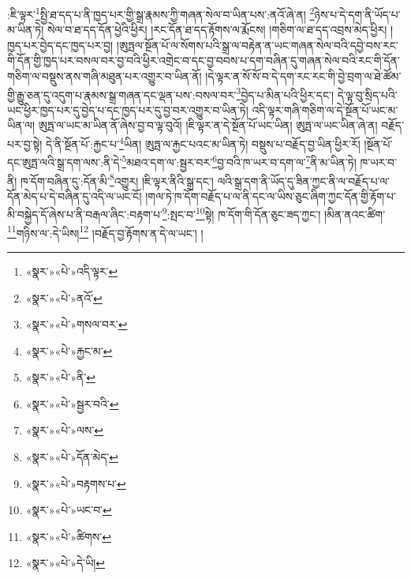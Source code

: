 :ཇི་ལྟར་\footnote{«སྣར་»«པེ་»འདི་ལྟར་}སྤྱི་ཐ་དད་པ་ནི་ཁྱད་པར་གྱི་སྒྲ་རྣམས་ཀྱི་གཞན་སེལ་བ་ཡིན་པས་:ནའོ་ཞེ་ན། \footnote{«སྣར་»«པེ་»ནའོ་}ཉེས་པ་དེ་དག་ནི་ཡོད་པ་མ་ཡིན་ཏེ། སེལ་བ་ཐ་དད་དོན་ཕྱེའི་ཕྱིར། །རང་དོན་ཐ་དད་རྟོགས་ལ་རྨོངས། །གཅིག་ལ་ཐ་དད་འབྲས་མེད་ཕྱིར། །ཁྱད་པར་བྱེད་དང་ཁྱད་པར་བྱ། །ཨུཏྤལ་སྔོན་པོ་ལ་སོགས་པའི་སྒྲ་ལ་བརྟེན་ན་ཡང་གཞན་སེལ་བའི་དབྱེ་བས་རང་གི་དོན་གྱི་ཁྱད་པར་བསལ་བར་བྱ་བའི་ཕྱིར་འགྲེང་བ་དང་བྱ་བབས་པ་དག་བཞིན་དུ་གཞན་སེལ་བའི་རང་གི་དོན་གཅིག་ལ་བསྡུས་ནས་གཞི་མཐུན་པར་འགྱུར་བ་ཡིན་ནོ། །དེ་ལྟར་ན་སོ་སོ་བ་དེ་དག་རང་རང་གི་བྱེ་བྲག་ལ་ཐེ་ཚོམ་གྱི་རྒྱུ་ཅན་དུ་འདུག་པ་རྣམས་སྒྲ་གཞན་དང་ལྡན་པས་:བསལ་བར་\footnote{«སྣར་»«པེ་»གསལ་བར་}བྱེད་པ་མིན་པའི་ཕྱིར་དང་། དེ་ལྟ་བུ་སྲིད་པའི་ཡང་ཕྱིར་ཁྱད་པར་དུ་བྱེད་པ་དང་ཁྱད་པར་དུ་བྱ་བར་འགྱུར་བ་ཡིན་ཏེ། འདི་ལྟར་གཞི་གཅིག་ལ་དེ་སྔོན་པོ་ཡང་མ་ཡིན་ལ། ཨུཏྤ་ལ་ཡང་མ་ཡིན་ནོ་ཞེས་བྱ་བ་ལྟ་བུའོ། །ཇི་ལྟར་ན་དེ་སྔོན་པོ་ཡང་ཡིན། ཨུཏྤ་ལ་ཡང་ཡིན་ཞེ་ན། བརྗོད་པར་བྱ་སྟེ། དེ་ནི་སྔོན་པོ་:རྐྱང་པ་\footnote{«སྣར་»«པེ་»རྐྱང་མ་}ཡིན། ཨུཏྤ་ལ་རྐྱང་པའང་མ་ཡིན་ཏེ། བསྡུས་པ་བརྗོད་བྱ་ཡིན་ཕྱིར་རོ། །སྔོན་པོ་དང་ཨུཏྤ་ལའི་སྒྲ་དག་ལས་:ནི་དེ་\footnote{«སྣར་»«པེ་»ནི་}མཐའ་དག་ལ་:སྦྱར་བར་\footnote{«སྣར་»«པེ་»སྦྱར་བའི་}བྱ་བའི་ཁ་ཡར་བ་དག་ལ་\footnote{«སྣར་»«པེ་»ལས་}ནི་མ་ཡིན་ཏེ། ཁ་ཡར་བ་ནི། ཁ་དོག་བཞིན་དུ་:དོན་མི་\footnote{«སྣར་»«པེ་»དོན་མེད་}འགྱུར། །ཇི་ལྟར་ནིའི་སྒྲ་དང་། ལའི་སྒྲ་དག་ནི་ཡོད་དུ་ཟིན་ཀྱང་ནི་ལ་བརྗོད་པ་ལ་དོན་མེད་པ་དེ་བཞིན་དུ་འདི་ལ་ཡང་ངོ། །གལ་ཏེ་ཁ་དོག་བརྗོད་པ་ལ་ནི་དང་ལ་ཡིས་ཅུང་ཞིག་ཀྱང་དོན་གྱི་རྟོག་པ་མི་བསྐྱེད་དོ་ཞེས་པ་ནི་བརྒལ་ཞིང་:བརྟག་པ་\footnote{«སྣར་»«པེ་»བརྟགས་པ་}:སྤང་བ་\footnote{«སྣར་»«པེ་»ཡང་བ་}སྟེ། ཁ་དོག་གི་དོན་ཅུང་ཟད་ཀྱང་། །མིན་ནའང་ཚིག་\footnote{«སྣར་»«པེ་»ཚིགས་}གཉིས་ལ་:དེ་ཡིས།\footnote{«སྣར་»«པེ་»དེ་ཡི།} །བརྗོད་བྱ་རྟོགས་ན་དེ་ལ་ཡང་། །
